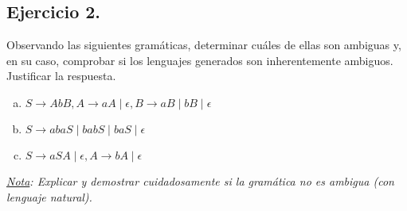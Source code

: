 \documentclass[11pt,a4paper]{article}
\begin{document}
\subsection{Ejercicio 2.} Observando las siguientes gramáticas, determinar cuáles de ellas son ambiguas y, en su caso, comprobar si los lenguajes generados son inherentemente ambiguos. Justificar la respuesta.
	\begin{enumerate}[a)]
		\item $S\rightarrow AbB, A\rightarrow aA\mid \epsilon, B\rightarrow aB\mid bB\mid \epsilon$
		\item $S\rightarrow abaS\mid babS\mid baS\mid \epsilon$
		\item $S\rightarrow aSA\mid \epsilon, A\rightarrow bA\mid \epsilon$
	\end{enumerate}
\textit{\underline{Nota}: Explicar y demostrar cuidadosamente si la gramática no es ambigua (con lenguaje natural).}
\end{document}
